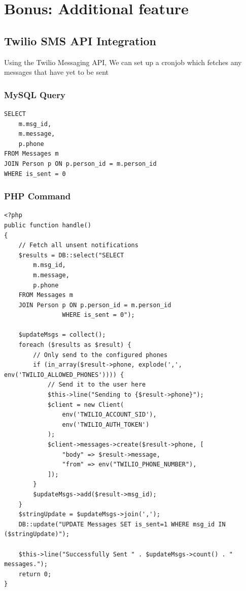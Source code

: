 \section{Bonus: Additional feature}
\subsection{Twilio SMS API Integration}

Using the Twilio Messaging API, We can set up a cronjob which fetches any messages that have yet to be sent

\subsubsection{MySQL Query}
\begin{verbatim}
SELECT
    m.msg_id,
    m.message,
    p.phone
FROM Messages m
JOIN Person p ON p.person_id = m.person_id
WHERE is_sent = 0
\end{verbatim}

\subsubsection{PHP Command}

\begin{verbatim}
<?php
public function handle()
{
    // Fetch all unsent notifications
    $results = DB::select("SELECT
        m.msg_id,
        m.message,
        p.phone
    FROM Messages m
    JOIN Person p ON p.person_id = m.person_id
                WHERE is_sent = 0");

    $updateMsgs = collect();
    foreach ($results as $result) {
        // Only send to the configured phones
        if (in_array($result->phone, explode(',', env('TWILIO_ALLOWED_PHONES')))) {
            // Send it to the user here
            $this->line("Sending to {$result->phone}");
            $client = new Client(
                env('TWILIO_ACCOUNT_SID'),
                env('TWILIO_AUTH_TOKEN')
            );
            $client->messages->create($result->phone, [
                "body" => $result->message,
                "from" => env("TWILIO_PHONE_NUMBER"),
            ]);
        }
        $updateMsgs->add($result->msg_id);
    }
    $stringUpdate = $updateMsgs->join(',');
    DB::update("UPDATE Messages SET is_sent=1 WHERE msg_id IN ($stringUpdate)");

    $this->line("Successfully Sent " . $updateMsgs->count() . " messages.");
    return 0;
}
\end{verbatim}

